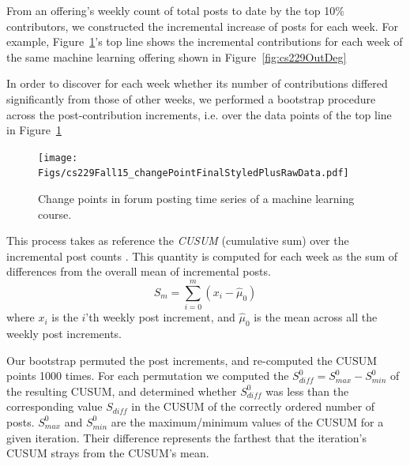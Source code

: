 From an offering's weekly count of total posts to date by the top 10\%
contributors, we constructed the incremental increase of posts for each
week. For example, Figure~\ref{fig:cs229ChangePts}'s top line shows
the incremental contributions for each week of the same machine
learning offering shown in Figure~\ref{fig:cs229OutDeg}

In order to discover for each week whether its number of contributions
differed significantly from those of other weeks, we performed a
bootstrap procedure across the post-contribution increments, i.e. over
the data points of the top line in Figure~\ref{fig:cs229ChangePts}
\cite{tayl16}
\begin{figure}[]
       \centering
       \texttt{[image: Figs/cs229Fall15\_changePointFinalStyledPlusRawData.pdf]}
       \caption{\textnormal{Change points in forum posting 
           time series of a machine learning course.}}
       \label{fig:cs229ChangePts}
\end{figure}
This process takes as reference the {\em CUSUM} (cumulative sum) over the incremental
post counts \cite{nist2012}. This quantity is computed for each week
as the sum of differences from the overall mean of incremental posts.
\begin{equation}
S_m = \sum_{i=0}^{m}(x_i-\hat{\mu}_0)
\end{equation}
where $x_i$ is the $i$'th weekly post increment, and $\hat{\mu}_0$ is
the mean across all the weekly post increments.

Our bootstrap permuted the post increments, and re-computed the CUSUM
points 1000 times. For each permutation we computed the $S_{diff}^0 =
S_{max}^0-S_{min}^0$ of the resulting CUSUM, and determined whether
$S_{diff}^0$ was less than the corresponding value $S_{diff}$ in the
CUSUM of the correctly ordered number of posts. $S_{max}^0$ and
$S_{min}^0$ are the maximum/minimum values of the CUSUM for a given
iteration. Their difference represents the farthest that the
iteration's CUSUM strays from the CUSUM's mean.

